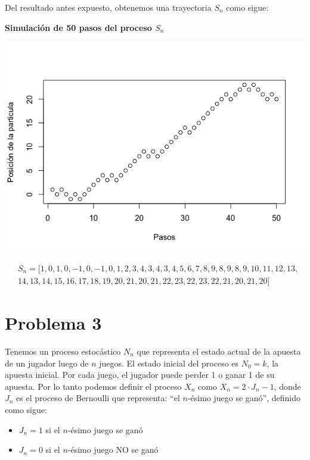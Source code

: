 \documentclass[11pt]{article}
\begin{document}
Del resultado antes expuesto, obtenemos una trayectoria $S_n$ como sigue:

\begin{center}\large\textbf{Simulación de 50 pasos del proceso $S_n$}\end{center}
\vspace{-0.9cm}
\includegraphics[scale = 0.6]{trayectoriaEJ2.png}

\begin{align*}
    &S_n = [1,0,1,0,-1,0,-1,0,1,2,3,4,3,4,3,4,5,6,7,8,9,8,9,8,9,10,11,12,13,\\
    &14,13,14,15,16,17,18,19,20,21,20,21,22,23,22,23,22,21,20,21,20]
\end{align*}


\section*{Problema 3}

Tenemos un proceso estocástico $N_n$ que representa el estado actual de la apuesta de un jugador luego de $n$ juegos. El estado inicial del proceso es $N_0 = k$, la apuesta inicial. Por cada juego, el jugador puede perder 1 o ganar 1 de su apuesta. Por lo tanto podemos definir el proceso $X_n$ como $X_n = 2 \cdot J_n - 1$, donde $J_n$ es el proceso de Bernoulli que representa: ``el $n$-ésimo juego se ganó'', definido como sigue:

\begin{itemize}
    \item $J_n = 1$ si el $n$-ésimo juego se ganó
    \item $J_n = 0$ si el $n$-ésimo juego NO se ganó
\end{itemize}
\end{document}
